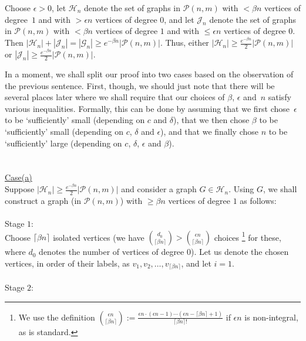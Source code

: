 \documentclass{article}
\newtheorem{Proof of Theorem}{Proof of Theorem}
\begin{document}
Choose $\epsilon >0$, let $\mathcal{H}_{n}$ denote the set of graphs in $\mathcal{P}(n,m)$ with 
$< \beta n$ vertices of degree~$1$ 
and with $> \epsilon n$ vertices of degree $0$,
and let
$\mathcal{J}_{n}$ denote the set of graphs in $\mathcal{P}(n,m)$ with 
$< \beta n$ vertices of degree $1$ and with $\leq \epsilon n$ vertices of degree $0$.
Then $|\mathcal{H}_{n}| + |\mathcal{J}_{n}| = |\mathcal{G}_{n}| \geq e^{-\beta n} |\mathcal{P}(n,m)|$.
Thus, either $|\mathcal{H}_{n}| \geq \frac{e^{-\beta n}}{2} |\mathcal{P}(n,m)|$ or 
$|\mathcal{J}_{n}| \geq \frac{e^{-\beta n}}{2} |\mathcal{P}(n,m)|$. 

In a moment,
we shall split our proof into two cases based on the observation of the previous sentence.
First, though,
we should just note that there will be several places later where we shall require
that our choices of $\beta$, $\epsilon$ and~$n$ satisfy various inequalities.
Formally, this can be done by assuming that we first chose~$\epsilon$ to be `sufficiently' small
(depending on $c$ and $\delta$),
that we then chose $\beta$ to be `sufficiently' small
(depending on $c$, $\delta$ and $\epsilon$),
and that we finally chose $n$ to be `sufficiently' large
(depending on $c$, $\delta$, $\epsilon$ and $\beta$). \\
\\
\\
\underline{Case(a)} \\
Suppose $|\mathcal{H}_{n}| \geq \frac{e^{-\beta n}}{2} |\mathcal{P}(n,m)|$ and consider a graph $G \in \mathcal{H}_{n}$.
Using $G$, we shall construct a graph (in $\mathcal{P}(n,m)$)
with $\geq \beta n$ vertices of degree $1$ as follows: \\
\\
Stage $1$: \\
Choose $\lceil \beta n \rceil$ isolated vertices 
(we have $\left(^{\phantom{p}d_{0}}_{\lceil \beta n \rceil}\right) > 
\left(^{\phantom{p}\epsilon n}_{\lceil \beta n \rceil}\right)$ 
choices 
\footnote{We use the definition 
$\left(^{\phantom{p}\epsilon n}_{\lceil \beta n \rceil}\right) :=
\frac{\epsilon n \cdot (\epsilon n -1) \cdots (\epsilon n - \lceil \beta n \rceil + 1)}
{\lceil \beta n \rceil !}$
if $\epsilon n$ is non-integral,
as is standard.}
for these,
where $d_{0}$ denotes the number of vertices of degree $0$).
Let us denote the chosen vertices, in order of their labels, as $v_{1}, v_{2}, \ldots, v_{\lceil \beta n \rceil}$,
and let $i=1$. \\
\\
Stage $2$: \\
\end{document}
